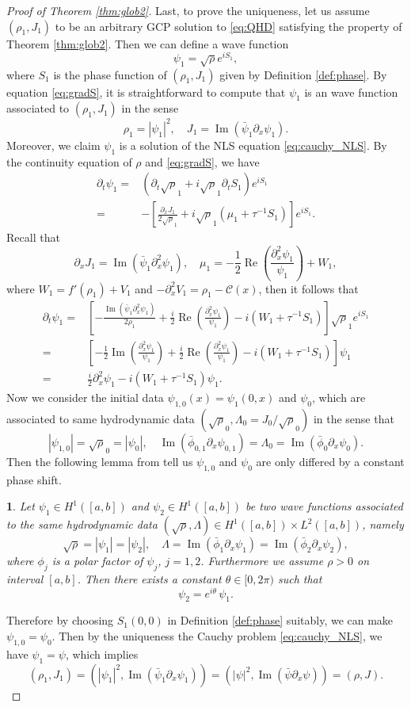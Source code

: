 \documentclass[leqno]{amsart}
\theoremstyle{plain}
\theoremstyle{definition}
\theoremstyle{remark}
\theoremstyle{plain}
\newtheorem{lem}[thm]{\protect\lemmaname}
\theoremstyle{plain}
\providecommand{\lemmaname}{Lemma}
\def\d{{\partial}}
\DeclareMathOperator{\RE}{Re}
\DeclareMathOperator{\IM}{Im}
\numberwithin{equation}{section}
\begin{document}
\begin{proof}[Proof of Theorem \ref{thm:glob2}]
Last, to prove the uniqueness, let us assume $(\rho_1, J_1)$ to be an arbitrary GCP solution to \eqref{eq:QHD} satisfying the property of Theorem \ref{thm:glob2}. Then we can define a wave function
\[
\psi_1=\sqrt{\rho}e^{i S_1},
\]
where $S_1$ is the phase function of $(\rho_1,J_1)$ given by Definition \ref{def:phase}. By equation \eqref{eq:gradS}, it is straightforward to compute that $\psi_1$ is an wave function associated to $(\rho_1,J_1)$ in the sense
\[
\rho_1=|\psi_1|^2,\quad J_1=\IM(\bar\psi_1\d_x\psi_1).
\]
Moreover, we claim $\psi_1$ is a solution of the NLS equation \eqref{eq:cauchy_NLS}. By the continuity equation of $\rho$ and \eqref{eq:gradS}, we have
\begin{align*}
\d_t\psi_1=&(\d_t\sqrt\rho_1+i\sqrt\rho_1\d_tS_1)e^{iS_1}\\
=&-\left[\frac{\d_xJ_1}{2\sqrt\rho_1}+i\sqrt\rho_1(\mu_1+\tau^{-1}S_1)\right]e^{iS_1}.
\end{align*}
Recall that
\[
\d_xJ_1=\IM(\bar\psi_1\d_x^2\psi_1),\quad \mu_1=-\frac12\RE\left(\frac{\d_x^2\psi_1}{\psi_1}\right)+W_1,
\]
where $W_1=f'(\rho_1)+V_1$ and $-\d_x^2 V_1=\rho_1-\mathcal{C}(x)$, then it follows that
\begin{align*}
\d_t\psi_1=&\left[-\frac{\IM(\bar\psi_1\d_x^2\psi_1)}{2\rho_1}+\frac{i}{2}\RE\left(\frac{\d_x^2\psi_1}{\psi_1}\right)-i(W_1+\tau^{-1}S_1)\right]\sqrt\rho_1 e^{iS_1}\\
=&\left[-\frac12\IM\left(\frac{\d_x^2\psi_1}{\psi_1}\right)+\frac{i}{2}\RE\left(\frac{\d_x^2\psi_1}{\psi_1}\right)-i(W_1+\tau^{-1}S_1)\right]\psi_1\\
=&\frac{i}{2}\d_x^2\psi_1-i(W_1+\tau^{-1}S_1)\psi_1.
\end{align*}
Now we consider the initial data $\psi_{1,0}(x)=\psi_1(0,x)$ and $\psi_0$, which are associated to same hydrodynamic data $(\sqrt\rho_0,\Lambda_0=J_0/\sqrt\rho_0)$ in the sense that
\[
|\psi_{1,0}|=\sqrt\rho_0=|\psi_0|,\quad \IM(\bar\phi_{0,1}\d_x\psi_{0,1})=\Lambda_0=\IM(\bar\phi_{0}\d_x\psi_{0}).
\]
Then the following lemma from \cite{AMZ1} tell us $\psi_{1,0}$ and $\psi_{0}$ are only differed by a constant phase shift.

\begin{lem}\label{lemma:rot}
Let $\psi_1\in H^1([a,b])$ and $\psi_2\in H^1([a,b])$ be two wave functions associated to the same hydrodynamic data $(\sqrt{\rho},\Lambda)\in H^1([a,b])\times L^2([a,b])$, namely
\[
\sqrt{\rho}=|\psi_1|=|\psi_2|,\quad \Lambda=\IM(\bar\phi_1\d_x\psi_1)=\IM(\bar\phi_2\d_x\psi_2),
\] 
where $\phi_j$ is a polar factor of $\psi_j$, $j=1,2$. Furthermore we assume $\rho>0$ on interval $[a,b]$. Then there exists a constant $\theta\in[0,2\pi)$ such that
\[
\psi_2=e^{i\theta}\,\psi_1.
\]
\end{lem}

Therefore by choosing $S_1(0,0)$ in Definition \ref{def:phase} suitably, we can make $\psi_{1,0}=\psi_{0}$. Then by the uniqueness the Cauchy problem \eqref{eq:cauchy_NLS}, we have $\psi_1=\psi$, which implies
\[
(\rho_1,J_1)=(|\psi_1|^2,\IM(\bar\psi_1\d_x\psi_1))=(|\psi|^2,\IM(\bar\psi\d_x\psi))=(\rho,J).
\]
\end{proof}
\end{document}
